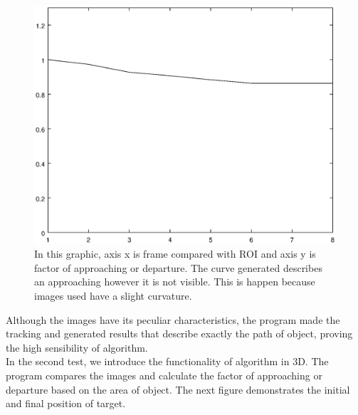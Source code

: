 \begin{figure}[H]
\includegraphics[width=\columnwidth]{images/graph1.eps}
\caption{In this graphic, axis x is frame compared with ROI and axis y is factor of approaching or departure.
The curve generated describes an approaching however it is not visible. This is happen because images used have a slight curvature.}
\label{fig:res_graph1}
\end{figure}

Although the images have its peculiar characteristics, the program made the tracking and generated results that describe exactly the path of 
object, proving the high sensibility of algorithm.\\
In the second test, we introduce the functionality of algorithm in 3D. The program compares the images and calculate the factor of approaching or 
departure based on the area of object. The next figure demonstrates the initial and final position of target.\\

